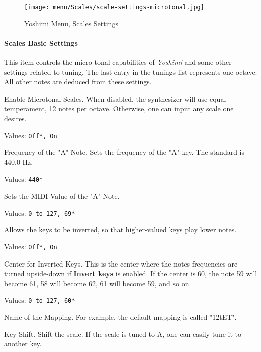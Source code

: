 \begin{figure}[H]
   \centering 
   \texttt{[image: menu/Scales/scale-settings-microtonal.jpg]}
   \caption{Yoshimi Menu, Scales Settings}
   \label{fig:yoshimi_menu_scales_settings}
\end{figure}

\paragraph{Scales Basic Settings}
\label{paragraph:menu_scales_basic_settings}

   This item controls the micro-tonal capabilities of \textsl{Yoshimi} and
   some other settings related to tuning. 
   The last entry in the tunings list represents one octave.
   All other notes are deduced from these settings.

   \setcounter{ItemCounter}{0}      %

   Enable Microtonal Scales.
   When disabled, the synthesizer will use equal-temperament, 12 notes per
   octave.  Otherwise, one can input any scale one desires.

   Values: \texttt{Off*, On}

   Frequency of the "A" Note.
   Sets the frequency of the "A" key. The standard is 440.0 Hz.

   Values: \texttt{440*}

   Sets the MIDI Value of the "A" Note.

   Values: \texttt{0 to 127, 69*}

   Allows the keys to be inverted, so that higher-valued keys play lower
   notes.

   Values: \texttt{Off*, On}

   Center for Inverted Keys.
   This is the center where the notes frequencies are turned upside-down if
   \textbf{Invert keys} is enabled.
   If the center is 60, the note 59 will become 61, 58 will become 62, 61
   will become 59, and so on.

   Values: \texttt{0 to 127, 60*}

   Name of the Mapping.
   For example, the default mapping is called "12tET".

   Key Shift.
   Shift the scale. If the scale is tuned to A, one can easily tune it to
   another key.

